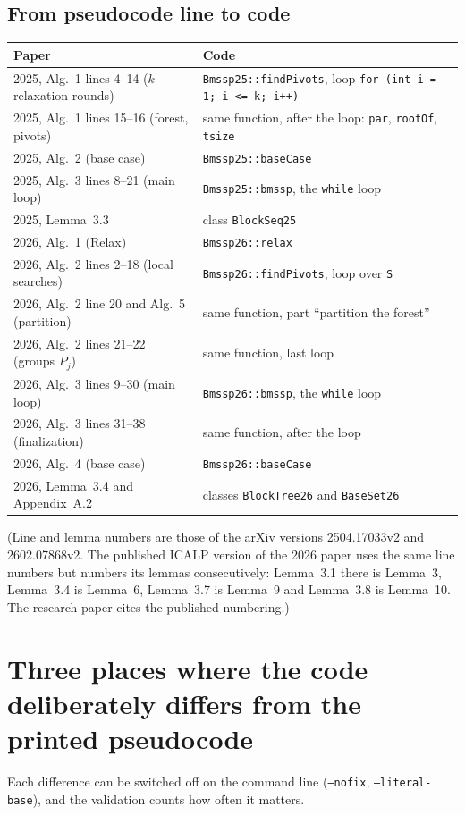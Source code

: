 \documentclass[11pt,a4paper]{article}
\newcommand{\code}[1]{\texttt{#1}}
\begin{document}
\subsection{From pseudocode line to code}
\begin{longtable}{@{}p{6.4cm}p{8.8cm}@{}}
\toprule
Paper & Code\\
\midrule
2025, Alg.~1 lines 4--14 ($k$ relaxation rounds) & \code{Bmssp25::findPivots}, loop \code{for (int i = 1; i <= k; i++)}\\
2025, Alg.~1 lines 15--16 (forest, pivots) & same function, after the loop: \code{par}, \code{rootOf}, \code{tsize}\\
2025, Alg.~2 (base case) & \code{Bmssp25::baseCase}\\
2025, Alg.~3 lines 8--21 (main loop) & \code{Bmssp25::bmssp}, the \code{while} loop\\
2025, Lemma~3.3 & class \code{BlockSeq25}\\
2026, Alg.~1 (Relax) & \code{Bmssp26::relax}\\
2026, Alg.~2 lines 2--18 (local searches) & \code{Bmssp26::findPivots}, loop over \code{S}\\
2026, Alg.~2 line 20 and Alg.~5 (partition) & same function, part ``partition the forest''\\
2026, Alg.~2 lines 21--22 (groups $P_j$) & same function, last loop\\
2026, Alg.~3 lines 9--30 (main loop) & \code{Bmssp26::bmssp}, the \code{while} loop\\
2026, Alg.~3 lines 31--38 (finalization) & same function, after the loop\\
2026, Alg.~4 (base case) & \code{Bmssp26::baseCase}\\
2026, Lemma~3.4 and Appendix~A.2 & classes \code{BlockTree26} and \code{BaseSet26}\\
\bottomrule
\end{longtable}
(Line and lemma numbers are those of the arXiv versions 2504.17033v2 and 2602.07868v2. The published ICALP version of the 2026 paper uses the same line numbers but numbers its lemmas consecutively: Lemma~3.1 there is Lemma~3, Lemma~3.4 is Lemma~6, Lemma~3.7 is Lemma~9 and Lemma~3.8 is Lemma~10. The research paper cites the published numbering.)

\section{Three places where the code deliberately differs from the printed pseudocode}\label{sec:fixes}
Each difference can be switched off on the command line (\code{--nofix}, \code{--literal-base}), and the validation counts how often it matters.
\end{document}
